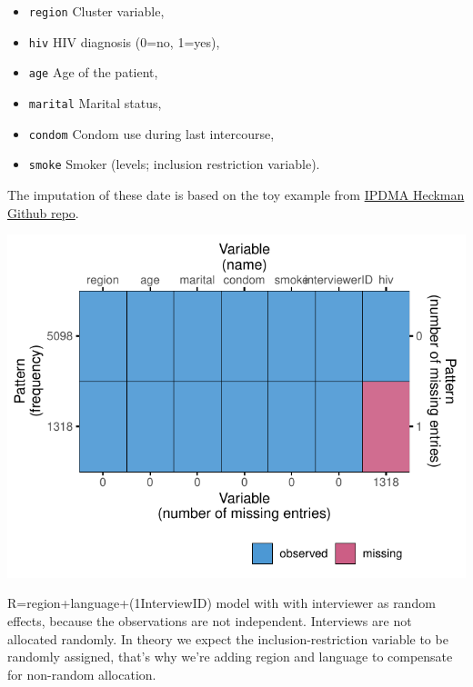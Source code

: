 \documentclass[
]{jss}
\providecommand{\tightlist}{%
  \setlength{\itemsep}{0pt}\setlength{\parskip}{0pt}}
\begin{document}
\begin{itemize}
\tightlist
\item
  \texttt{region} Cluster variable,
\item
  \texttt{hiv} HIV diagnosis (0=no, 1=yes),
\item
  \texttt{age} Age of the patient,
\item
  \texttt{marital} Marital status,
\item
  \texttt{condom} Condom use during last intercourse,
\item
  \texttt{smoke} Smoker (levels; inclusion restriction variable).
\end{itemize}

The imputation of these date is based on the toy example from
\href{https://github.com/johamunoz/Heckman-IPDMA/blob/main/Toy_example.R}{IPDMA
Heckman Github repo}.

\begin{CodeChunk}


\begin{center}\includegraphics{Imputation_of_Incomplete_Multilevel_Data_files/figure-latex/hiv-1} \end{center}

\end{CodeChunk}

R=region+language+(1\textbar InterviewID) model with with interviewer as
random effects, because the observations are not independent. Interviews
are not allocated randomly. In theory we expect the
inclusion-restriction variable to be randomly assigned, that's why we're
adding region and language to compensate for non-random allocation.
\end{document}
